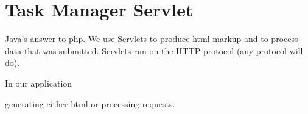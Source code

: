 \chapter{Task Manager Servlet}

Java's answer to php. We use Servlets to produce html markup and to process data that was submitted. Servlets run on the HTTP protocol (any protocol will do).  


In our application 

generating either html or processing requests.  
 